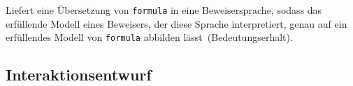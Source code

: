 \begin{description}%

    Liefert eine Übersetzung von \texttt{formula} in eine
    Beweisersprache, sodass das erfüllende Modell eines Beweisers, der
    diese Sprache interpretiert, genau auf ein erfüllendes Modell von
    \texttt{formula} abbilden lässt~(Bedeutungserhalt).%


\end{description}%

\subsection{Interaktionsentwurf}%
